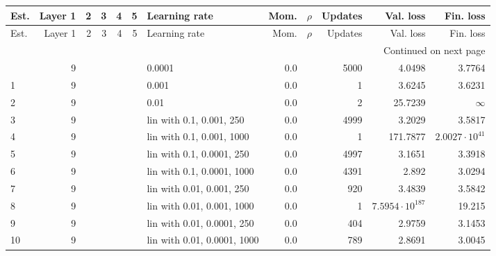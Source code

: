 \begin{longtable}{lrrrrrlrrrrr}
\label{tab:Results_preliminary}\\
\toprule
Est. & Layer 1 & 2 & 3 & 4 & 5 &               Learning rate & Mom. & $\rho$ & Updates &              Val. loss &              Fin. loss \\
\midrule
\endfirsthead

\toprule
Est. & Layer 1 & 2 & 3 & 4 & 5 &               Learning rate & Mom. & $\rho$ & Updates &              Val. loss &              Fin. loss \\
\midrule
\endhead
\midrule
\multicolumn{12}{r}{{Continued on next page}} \\
\midrule
\endfoot

\bottomrule
\endlastfoot
   0 &       9 &   &   &   &   &                      0.0001 &  0.0 &        &    5000 &                 4.0498 &                 3.7764 \\
   1 &       9 &   &   &   &   &                       0.001 &  0.0 &        &       1 &                 3.6245 &                 3.6231 \\
   2 &       9 &   &   &   &   &                        0.01 &  0.0 &        &       2 &                25.7239 &               $\infty$ \\
   3 &       9 &   &   &   &   &    lin with 0.1, 0.001, 250 &  0.0 &        &    4999 &                 3.2029 &                 3.5817 \\
   4 &       9 &   &   &   &   &   lin with 0.1, 0.001, 1000 &  0.0 &        &       1 &               171.7877 &  $2.0027\cdot 10^{41}$ \\
   5 &       9 &   &   &   &   &   lin with 0.1, 0.0001, 250 &  0.0 &        &    4997 &                 3.1651 &                 3.3918 \\
   6 &       9 &   &   &   &   &  lin with 0.1, 0.0001, 1000 &  0.0 &        &    4391 &                  2.892 &                 3.0294 \\
   7 &       9 &   &   &   &   &   lin with 0.01, 0.001, 250 &  0.0 &        &     920 &                 3.4839 &                 3.5842 \\
   8 &       9 &   &   &   &   &  lin with 0.01, 0.001, 1000 &  0.0 &        &       1 & $7.5954\cdot 10^{187}$ &                 19.215 \\
   9 &       9 &   &   &   &   &  lin with 0.01, 0.0001, 250 &  0.0 &        &     404 &                 2.9759 &                 3.1453 \\
  10 &       9 &   &   &   &   & lin with 0.01, 0.0001, 1000 &  0.0 &        &     789 &                 2.8691 &                 3.0045 \\

\end{longtable}
